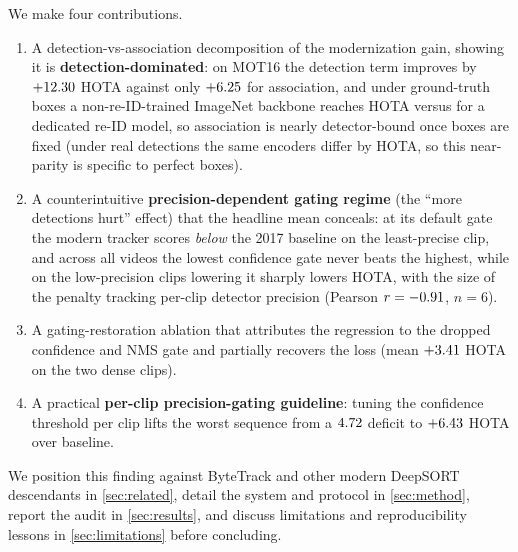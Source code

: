 We make four contributions.
\begin{enumerate}
\item A detection-vs-association decomposition of the modernization gain, showing it is
\textbf{detection-dominated}: on MOT16 the detection term improves by $+12.30$ HOTA against only
$+6.25$ for association, and under ground-truth boxes a non-re-ID-trained ImageNet backbone reaches
\timmGT{} HOTA versus \osnetGT{} for a dedicated re-ID model, so association is nearly detector-bound once
boxes are fixed (under real detections the same encoders differ by \reidRealGap{} HOTA, so this
near-parity is specific to perfect boxes).
\item A counterintuitive \textbf{precision-dependent gating regime} (the ``more detections hurt'' effect)
that the headline mean conceals: at its default gate the modern tracker scores \emph{below} the 2017
baseline on the least-precise clip, and across all \nVideos{} videos the lowest confidence gate never beats
the highest, while on the low-precision clips lowering it sharply lowers HOTA, with the size of the penalty
tracking per-clip detector precision (Pearson $r = -0.91$, $n=6$).
\item A gating-restoration ablation that attributes the regression to the dropped confidence and NMS gate
and partially recovers the loss (mean $+3.41$ HOTA on the two dense clips).
\item A practical \textbf{per-clip precision-gating guideline}: tuning the confidence threshold per clip
lifts the worst sequence from a $4.72$ deficit to $+6.43$ HOTA over baseline.
\end{enumerate}

We position this finding against ByteTrack \cite{zhang2022bytetrack} and other modern DeepSORT descendants
\cite{du2023strongsort,cao2023ocsort,aharon2022botsort} in \cref{sec:related}, detail the system and
protocol in \cref{sec:method}, report the audit in \cref{sec:results}, and discuss limitations and
reproducibility lessons in \cref{sec:limitations} before concluding.
